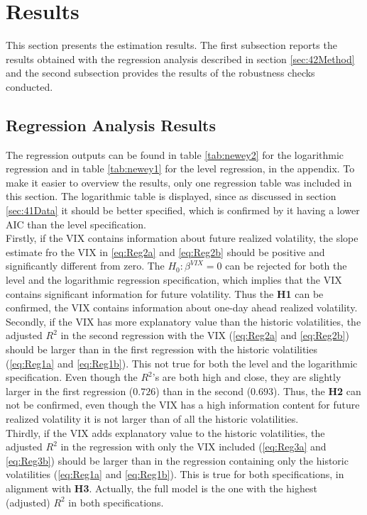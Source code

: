 
\section{Results}\label{sec:5Results}

This section presents the estimation results. The first subsection reports the results obtained with the regression analysis described in section \ref{sec:42Method} and the second subsection provides the results of the robustness checks conducted. 

\subsection{Regression Analysis Results}\label{sec:51Regression}
The regression outputs can be found in table \ref{tab:newey2} for the logarithmic regression and in table \ref{tab:newey1} for the level regression, in the appendix. To make it easier to overview the results, only one regression table was included in this section. The logarithmic table is displayed, since as discussed in section \ref{sec:41Data} it should be better specified, which is confirmed by it having a lower AIC than the level specification.\\
Firstly, if the VIX contains information about future realized volatility, the slope estimate fro the VIX in \ref{eq:Reg2a} and \ref{eq:Reg2b} should be positive and significantly different from zero. The $H_{0}: \beta^{VIX} = 0$ can be rejected for both the level and the logarithmic regression specification, which implies that the VIX contains significant information for future volatility. Thus the \textbf{\ac{H1}} can be confirmed, the VIX contains information about one-day ahead realized volatility.\\
Secondly, if the VIX has more explanatory value than the historic volatilities, the adjusted $R^{2}$ in the second regression with the \ac{VIX} (\ref{eq:Reg2a} and \ref{eq:Reg2b}) should be larger than in the first regression with the historic volatilities (\ref{eq:Reg1a} and \ref{eq:Reg1b}). This not true for both the level and the logarithmic specification. Even though the $R^{2}$'s are both high and close, they are slightly larger in the first regression ($0.726$) than in the second ($0.693$). Thus, the \textbf{\ac{H2}} can not be confirmed, even though the VIX has a high information content for future realized volatility it is not larger than of all the historic volatilities.\\
Thirdly, if the VIX adds explanatory value to the historic volatilities, the adjusted $R^{2}$ in the regression with only the VIX included (\ref{eq:Reg3a} and \ref{eq:Reg3b}) should be larger than in the regression containing only the historic volatilities (\ref{eq:Reg1a} and \ref{eq:Reg1b}). This is true for both specifications, in alignment with \textbf{\ac{H3}}. Actually, the full model is the one with the highest (adjusted) $R^{2}$ in both specifications. \\
